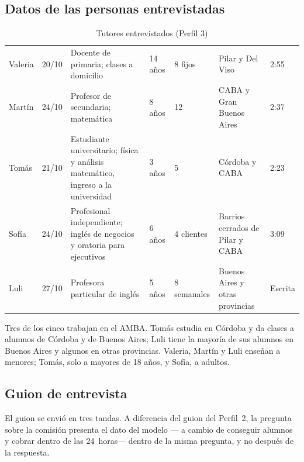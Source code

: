 \subsection{Datos de las personas entrevistadas}

\begin{table}[H]
    \centering
    \caption{Tutores entrevistados (Perfil 3)}
    \label{tab:tutores-entrevistados}
    \small
    \begin{tabularx}{\textwidth}{l l L l l L l}
        \toprule
         &  &  &  &  &  &  \\
        \midrule
        Valeria & 20/10 & Docente de primaria; clases a domicilio & 14 años & 8 fijos & Pilar y Del Viso & 2:55 \\
        Martín & 24/10 & Profesor de secundaria; matemática & 8 años & 12 & CABA y Gran Buenos Aires & 2:37 \\
        Tomás & 21/10 & Estudiante universitario; física y análisis matemático, ingreso a la universidad & 3 años & 5 & Córdoba y CABA & 2:23 \\
        Sofía & 24/10 & Profesional independiente; inglés de negocios y oratoria para ejecutivos & 6 años & 4 clientes & Barrios cerrados de Pilar y CABA & 3:09 \\
        Luli & 27/10 & Profesora particular de inglés & 5 años & 8 semanales & Buenos Aires y otras provincias & Escrita \\
        \bottomrule
    \end{tabularx}
\end{table}

Tres de los cinco trabajan en el AMBA. Tomás estudia en Córdoba y da
clases a alumnos de Córdoba y de Buenos Aires; Luli tiene la mayoría de
sus alumnos en Buenos Aires y algunos en otras provincias. Valeria,
Martín y Luli enseñan a menores; Tomás, solo a mayores de 18 años, y
Sofía, a adultos.

\subsection{Guion de entrevista}\label{sec:guion-perfil3}

El guion se envió en tres tandas. A diferencia del guion del Perfil~2,
la pregunta sobre la comisión presenta el dato del modelo
---\comision{} a cambio de conseguir alumnos y cobrar dentro de las
24~horas--- dentro de la misma pregunta, y no después de la respuesta.

